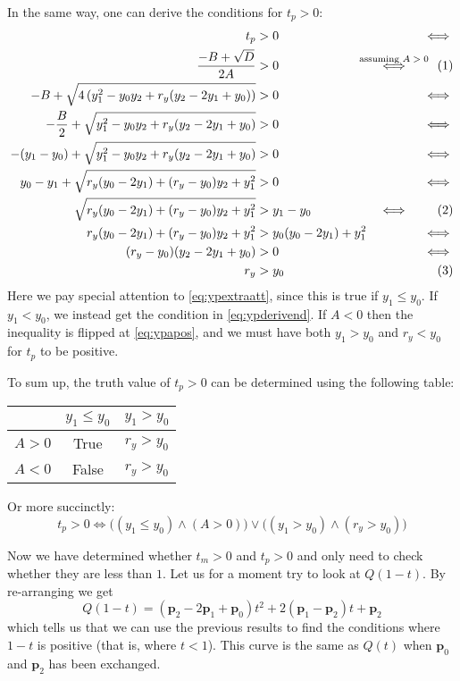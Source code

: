 \documentclass[11pt, a4paper]{article}
\newcommand{\numberhere}{\stepcounter{equation}\tag{\theequation}}
\renewcommand\vec[1]{\boldsymbol{#1}}
\begin{document}
In the same way, one can derive the conditions for $t_p > 0$:
\begin{align*}
t_p &> 0 & \iff\\
\frac{-B+\sqrt{D}}{2A} &> 0 &\overset{\mathclap{\text{assuming $A > 0$}}}\iff\numberhere\label{eq:ypapos}\\
-B+\sqrt{4\left(y_1^2 - y_0y_2 + r_y(y_2 - 2y_1 + y_0)\right)} &> 0 & \iff\\
-\frac B2 + \sqrt{y_1^2 - y_0y_2 + r_y(y_2 - 2y_1 + y_0)} &> 0 & \iff\\
-(y_1-y_0)+\sqrt{y_1^2 - y_0y_2 + r_y(y_2 - 2y_1 + y_0)} &> 0 & \iff\\
y_0-y_1+\sqrt{r_y(y_0-2y_1)+(r_y-y_0)y_2+y_1^2} &> 0 & \iff\\
\sqrt{r_y(y_0-2y_1)+(r_y-y_0)y_2+y_1^2} &> y_1-y_0 & \iff\numberhere\label{eq:ypextraatt}\\
r_y(y_0-2y_1)+(r_y-y_0)y_2+y_1^2 &> y_0(y_0-2y_1)+y_1^2 &\iff\\
(r_y-y_0)(y_2-2y_1+y_0) &> 0 &\iff\\
r_y &> y_0&\numberhere\label{eq:ypderivend}
\end{align*}
Here we pay special attention to \eqref{eq:ypextraatt}, since this is true if $y_1 \leq y_0$. If $y_1 < y_0$, we instead get the condition in \eqref{eq:ypderivend}. If $A < 0$ then the inequality is flipped at \eqref{eq:ypapos}, and we must have both $y_1 > y_0$ and $r_y < y_0$ for $t_p$ to be positive.

To sum up, the truth value of $t_p > 0$ can be determined using the following table:
\begin{table}[H]
\centering
\begin{tabular}{c|c|c}
& $y_1 \leq y_0$ & $y_1 > y_0$ \\\hline
$A > 0$ & True & $r_y > y_0$ \\\hline
$A < 0$ & False & $r_y > y_0$
\end{tabular}
\end{table}
Or more succinctly:
\begin{equation*}
t_p > 0 \iff \big((y_1 \leq y_0) \land (A > 0)\big) \lor \big((y_1 > y_0) \land (r_y > y_0)\big)
\end{equation*}

Now we have determined whether $t_m > 0$ and $t_p > 0$ and only need to check whether they are less than $1$. Let us for a moment try to look at $Q(1-t)$. By re-arranging we get
\begin{equation}
Q(1-t) = (\vec p_2 - 2\vec p_1 + \vec p_0)t^2 + 2(\vec p_1 - \vec p_2)t + \vec p_2
\end{equation}
which tells us that we can use the previous results to find the conditions where $1-t$ is positive (that is, where $t < 1$). This curve is the same as $Q(t)$ when $\vec p_0$ and $\vec p_2$ has been exchanged.
\end{document}
